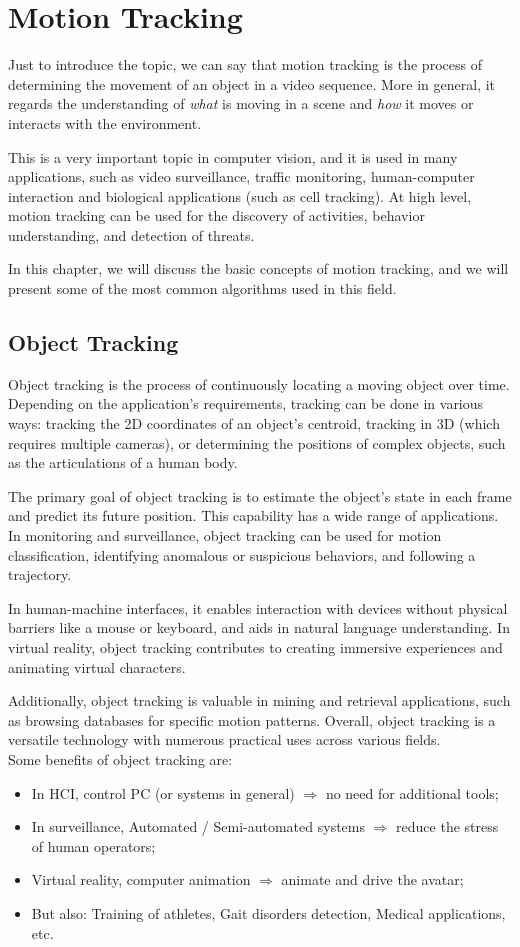 \chapter{Motion Tracking}
Just to introduce the topic, we can say that motion tracking is the process of determining the movement of an object in a video sequence. 
More in general, it regards the understanding of \textit{what} is moving in a scene and \textit{how} it moves or interacts with the environment.

This is a very important topic in computer vision, and it is used in many applications, such as video surveillance, traffic monitoring, human-computer interaction and biological applications (such as cell tracking). 
At high level, motion tracking can be used for the discovery of activities, behavior understanding, and detection of threats.

In this chapter, we will discuss the basic concepts of motion tracking, and we will present some of the most common algorithms used in this field.

\section{Object Tracking}
Object tracking is the process of continuously locating a moving object over time. 
Depending on the application's requirements, tracking can be done in various ways: tracking the 2D coordinates of an object's centroid, tracking in 3D (which requires multiple cameras), or determining the positions of complex objects, such as the articulations of a human body.

The primary goal of object tracking is to estimate the object's state in each frame and predict its future position. 
This capability has a wide range of applications. In monitoring and surveillance, object tracking can be used for motion classification, identifying anomalous or suspicious behaviors, and following a trajectory.

In human-machine interfaces, it enables interaction with devices without physical barriers like a mouse or keyboard, and aids in natural language understanding. 
In virtual reality, object tracking contributes to creating immersive experiences and animating virtual characters.

Additionally, object tracking is valuable in mining and retrieval applications, such as browsing databases for specific motion patterns. 
Overall, object tracking is a versatile technology with numerous practical uses across various fields.
\\
Some benefits of object tracking are:
\begin{itemize}
\item In HCI, control PC (or systems in general) $\Rightarrow$ no need for additional tools;
\item In surveillance, Automated / Semi-automated systems $\Rightarrow$ reduce the stress of human operators;
\item Virtual reality, computer animation $\Rightarrow$ animate and drive the avatar;
\item But also: Training of athletes, Gait disorders detection, Medical applications, etc.
\end{itemize}

